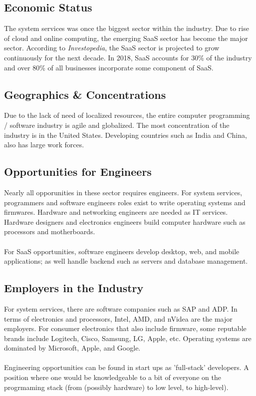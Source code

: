 \documentclass[10pt,letterpaper]{article}
\begin{document}
\subsection{Economic Status}

The system services was once the biggest sector within the industry. Due to rise of cloud and online computing, the emerging SaaS sector has become the major sector. According to \textit{Investopedia}, the SaaS sector is projected to grow continuously for the next decade. In 2018, SaaS accounts for 30\% of the industry and over 80\% of all businesses incorporate some component of SaaS\cite{software-industry}.\\

\subsection{Geographics \& Concentrations}
Due to the lack of need of localized resources, the entire computer programming / software industry is agile and globalized. The most concentration of the industry is in the United States. Developing countries such as India and China, also has large work forces.\\

\subsection{Opportunities for Engineers}
Nearly all opporunities in these sector requires engineers. For system services, programmers and software engineers roles exist to write operating systems and firmwares. Hardware and networking engineers are needed as IT services. Hardware designers and electronics engineers build computer hardware such as processors and motherboards.\\
\\
For SaaS opportunities, software engineers develop desktop, web, and mobile applications; as well handle backend such as servers and database management.\\

\subsection{Employers in the Industry}

For system services, there are software companies such as SAP and ADP. In terms of electronics and processors, Intel, AMD, and nVidea are the major employers. For consumer electronics that also include firmware, some reputable brands include Logitech, Cisco, Samsung, LG, Apple, etc. Operating systems are dominated by Microsoft, Apple, and Google.\\
\\
Engineering opportunities can be found in start ups as 'full-stack' developers. A position where one would be knowledgeable to a bit of everyone on the progrmaming stack (from (possibly hardware) to low level, to high-level).
\end{document}
